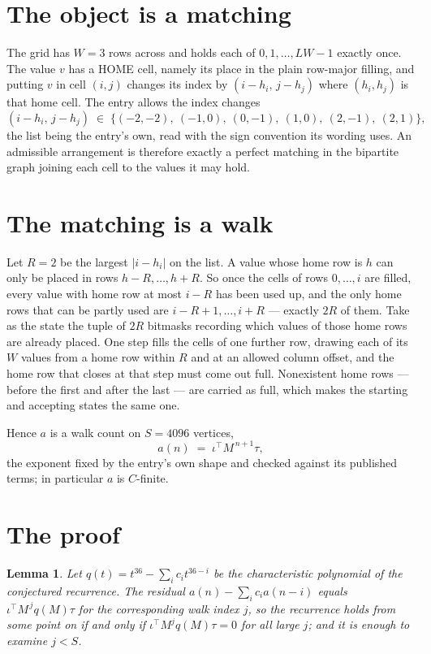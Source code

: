\documentclass[11pt,a4paper]{article}
\theoremstyle{plain}
\newtheorem{lemma}[theorem]{Lemma}
\theoremstyle{definition}
\begin{document}
\section{The object is a matching}

The grid has $W=3$ rows across and holds each of $0,1,\dots,LW-1$ exactly once. The value
$v$ has a HOME cell, namely its place in the plain row-major filling, and putting $v$ in cell
$(i,j)$ changes its index by $(i-h_i,\,j-h_j)$ where $(h_i,h_j)$ is that home cell. The entry
allows the index changes
\[
(i-h_i,\,j-h_j)\;\in\;\{(-2,-2),\ (-1,0),\ (0,-1),\ (1,0),\ (2,-1),\ (2,1)\},
\]
the list being the entry's own, read with the sign convention its wording uses. An admissible
arrangement is therefore exactly a perfect matching in the bipartite graph joining each cell to
the values it may hold.

\section{The matching is a walk}

Let $R=2$ be the largest $|i-h_i|$ on the list. A value whose home row is $h$ can only be
placed in rows $h-R,\dots,h+R$. So once the cells of rows $0,\dots,i$ are filled, every
value with home row at most $i-R$ has been used up, and the only home rows that can be
partly used are $i-R+1,\dots,i+R$ --- exactly $2R$ of them. Take as the state the tuple of
$2R$ bitmasks recording which values of those home rows are already placed. One step fills
the cells of one further row, drawing each of its $W$ values from a home row within $R$
and at an allowed column offset, and the home row that closes at that step must come out
full. Nonexistent home rows --- before the first and after the last --- are carried as
full, which makes the starting and accepting states the same one.

Hence $a$ is a walk count on $S=4096$ vertices,
\[
a(n)\;=\;\iota^{\!\top}M^{\,n+1}\tau ,
\]
the exponent fixed by the entry's own shape and checked against its published terms; in
particular $a$ is $C$-finite.

\section{The proof}

\begin{lemma}\label{lem:crit}
Let $q(t)=t^{36}-\sum_i c_it^{36-i}$ be the characteristic polynomial of the
conjectured recurrence. The residual $a(n)-\sum_ic_ia(n-i)$ equals
$\iota^{\!\top}M^{\,j}q(M)\tau$ for the corresponding walk index $j$, so the recurrence
holds from some point on if and only if $\iota^{\!\top}M^{j}q(M)\tau=0$ for all large $j$;
and it is enough to examine $j<S$.
\end{lemma}
\end{document}

